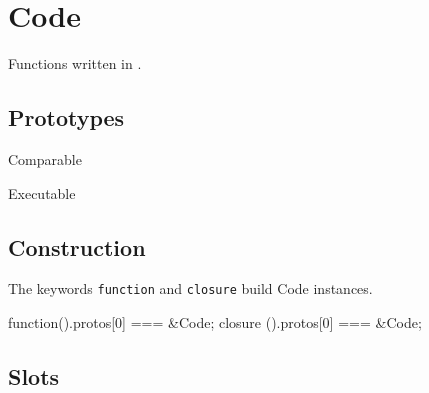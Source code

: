 
\section{Code}

Functions written in \us.

\subsection{Prototypes}

\begin{refObjects}
\item[Comparable]
\item[Executable]
\end{refObjects}

\subsection{Construction}

The keywords \lstinline|function| and \lstinline|closure| build Code
instances.

\begin{urbiassert}
function(){}.protos[0] === &Code;
closure (){}.protos[0] === &Code;
\end{urbiassert}

\subsection{Slots}

